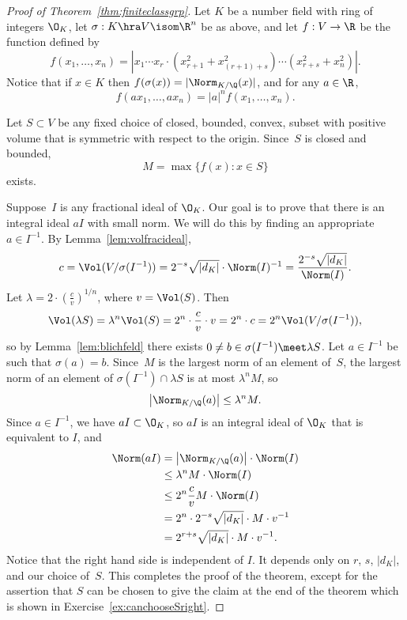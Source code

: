 \begin{proof}[Proof of Theorem~\ref{thm:finiteclassgrp}]
Let $K$ be a number field with ring of integers $\O_K$,
let $\sigma:K\hra V\isom \R^n$ be as above,
and let $f:V\to \R$ be the function defined by
\[
  f(x_1,\ldots, x_n) = |x_1\cdots x_r\cdot (x_{r+1}^2 + x_{(r+1)+s}^2)\cdots (x_{r+s}^2 + x_n^2)|.
\]
Notice that if $x\in K$ then $f(\sigma(x)) = |\Norm_{K/\Q}(x)|$,
and for any $a\in \R$,
 $$
  f(ax_1, \ldots,  ax_n) = |a|^n f(x_1,\ldots, x_n).
$$

Let $S\subset V$ be any fixed choice of closed, bounded, convex, subset with
positive volume that is symmetric with respect to the origin.
Since~$S$ is closed and bounded,
\[
  M = \max\{f(x) : x \in S\}
\]
exists.

Suppose~$I$ is any  fractional ideal of $\O_K$.  Our goal
is to prove that there is an integral ideal $aI$ with small norm. We
will do this by finding an appropriate $a\in I^{-1}$.
By Lemma~\ref{lem:volfracideal},
\[
 c=\Vol(V/\sigma(I^{-1})) = 2^{-s}\sqrt{|d_K|}\cdot \Norm(I)^{-1}
        = \frac{2^{-s} \sqrt{|d_K|}}{\Norm(I)}.
\]
Let $\lambda = 2\cdot\left(\frac{c}{v}\right)^{1/n}$, where $v=\Vol(S)$.
Then
\[
   \Vol(\lambda{} S) = \lambda^n \Vol(S) = 2^n\cdot \frac{c}{v} \cdot v = 2^n\cdot c=
  2^n \Vol(V/\sigma(I^{-1})),
\]
so by Lemma~\ref{lem:blichfeld} there exists
$0\neq b\in \sigma(I^{-1})\meet \lambda S$.
Let $a \in I^{-1}$ be such that $\sigma(a)=b$.
Since~$M$ is the largest norm of an element of~$S$, the largest norm
of an element of $\sigma(I^{-1})\cap  \lambda{}S$ is at most $\lambda^n M$,
so
\[
  \left|\Norm_{K/\Q}(a)\right| \leq \lambda^n M.
\]
Since $a\in I^{-1}$, we have $aI \subset \O_K$, so
$aI$ is an integral ideal of $\O_K$ that is equivalent to $I$, and
\begin{align*}
  \Norm(aI) &= \left|\Norm_{K/\Q}(a)\right|\cdot \Norm(I)\\
    &\leq \lambda^n M\cdot \Norm(I)\\
    &\leq 2^n \frac{c}{v} M \cdot \Norm(I)\\
    &= 2^n\cdot 2^{-s} \sqrt{|d_K|} \cdot M \cdot v^{-1}\\
    &= 2^{r+s} \sqrt{|d_K|} \cdot M \cdot v^{-1}.
\end{align*}
Notice that the right hand side is independent of $I$.  It
depends only on $r$, $s$, $|d_K|$, and our choice of~$S$.
This completes the proof of the theorem, except for
the assertion that $S$ can be chosen to give the claim
at the end of the theorem which is shown in Exercise~\ref{ex:canchooseSright}.
\end{proof}

